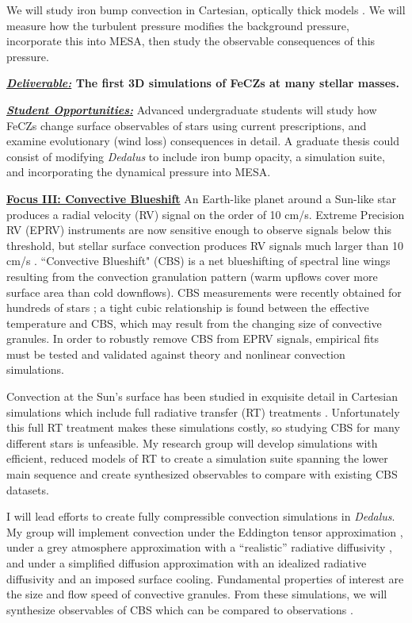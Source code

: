 \documentclass[12pt]{article}
\newcommand{\sct}[1]{\vspace{0.3cm}\hspace{-\parindent}\textbf{\underline{#1}}\hspace{0.3cm}}
\begin{document}
We will study iron bump convection in Cartesian, optically thick models \citep[good approximations,][]{jermyn_etal_2022_atlas}.
We will measure how the turbulent pressure modifies the background pressure, incorporate this into MESA, then study the observable consequences of this pressure.

\textbf{\underline{\emph{Deliverable:}} The first 3D simulations of FeCZs at many stellar masses.}

\textbf{\underline{\emph{Student Opportunities:}}} Advanced undergraduate students will study how FeCZs change surface observables of stars using current prescriptions, and examine evolutionary (wind loss) consequences in detail.
A graduate thesis could consist of modifying \emph{Dedalus} to include iron bump opacity, a simulation suite, and incorporating the dynamical pressure into MESA.

\sct{Focus III: Convective Blueshift}
An Earth-like planet around a Sun-like star produces a radial velocity (RV) signal on the order of 10 cm/s.
Extreme Precision RV (EPRV) instruments are now sensitive enough to observe signals below this threshold, but stellar surface convection produces RV signals much larger than 10 cm/s \citep{crass_etal_2021}.
``Convective Blueshift" (CBS) is a net blueshifting of spectral line wings resulting from the convection granulation pattern (warm upflows cover more surface area than cold downflows).
CBS measurements were recently obtained for hundreds of stars \citep{liebing_etal_2021}; a tight cubic relationship is found between the effective temperature and CBS, which may result from the changing size of convective granules. %
In order to robustly remove CBS from EPRV signals, empirical fits must be tested and validated against theory and nonlinear convection simulations. 

Convection at the Sun's surface has been studied in exquisite detail in Cartesian simulations which include full radiative transfer (RT) treatments \citep[e.g.,][]{rempel2020, danilovic_etal_2022}.
Unfortunately this full RT treatment makes these simulations costly, so studying CBS for many different stars is unfeasible.
My research group will develop simulations with efficient, reduced models of RT to create a simulation suite spanning the lower main sequence and create synthesized observables to compare with existing CBS datasets.

I will lead efforts to create fully compressible convection simulations in \emph{Dedalus}.
My group will implement convection under the Eddington tensor approximation \citep[e.g., ref.][sct.~XI.G]{burns_etal_2020}, under a grey atmosphere approximation with a ``realistic'' radiative diffusivity \citep{barekat_brandenburg_2014}, and under a simplified diffusion approximation with an idealized radiative diffusivity and an imposed surface cooling.
Fundamental properties of interest are the size and flow speed of convective granules.
From these simulations, we will synthesize observables of CBS which can be compared to observations \citep{liebing_etal_2021}.
\end{document}
